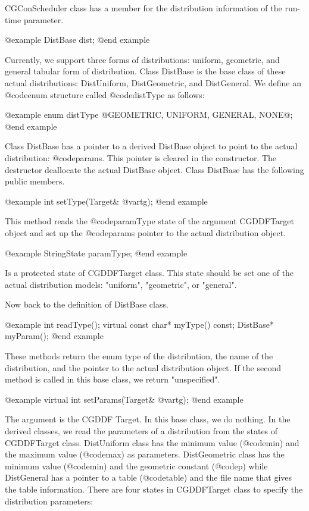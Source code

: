{CGConScheduler class has a member for the distribution information 
of the run-time parameter.

@example
DistBase dist;
@end example

Currently, we support three forms of distributions: uniform, geometric, and
general tabular form of distribution. Class DistBase is the base
class of these actual distributions: DistUniform, DistGeometric, and
DistGeneral. We define an @code{enum} structure called
@code{distType} as follows:

@example
enum distType @{GEOMETRIC, UNIFORM, GENERAL, NONE@};
@end example

Class DistBase has a pointer to a derived DistBase object to point to the
actual distribution: @code{params}. This pointer is cleared in
the constructor. The destructor deallocate the actual DistBase object.
Class DistBase has the following public members.

@example
int setType(Target& @var{tg});
@end example

This method reads the @code{paramType} state of the argument CGDDFTarget
object and set up the @code{params} pointer to the actual distribution
object.

@example
StringState paramType;
@end example

Is a protected state of CGDDFTarget class. This state should be set
one of the actual distribution models: "uniform", "geometric", or
"general".

Now back to the definition of DistBase class.

@example
int readType();
virtual const char* myType() const;
DistBase* myParam();
@end example

These methods return the  enum type of the distribution, the name
of the distribution, and the pointer to the actual distribution object. If
the second method is called in this base class, we return "unspecified".

@example
virtual int setParams(Target& @var{tg});
@end example

The argument is the CGDDF Target. In this base class, we do nothing.
In the derived classes, we read the parameters of a distribution from
the states of CGDDFTarget class. DistUniform class has the minimum
value (@code{min}) and the maximum value (@code{max}) as parameters.
DistGeometric class has the minimum value (@code{min}) and the geometric
constant (@code{p}) while DistGeneral has a pointer to a table (@code{table})
and the file name that gives the table information. There are four states
in CGDDFTarget class to specify the distribution parameters:

}
